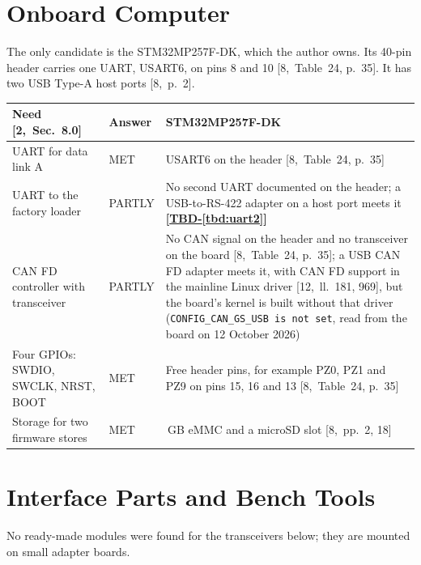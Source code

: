 \documentclass[11pt,a4paper]{article}
\newcommand{\tbd}[1]{\mbox{\textbf{[\hyperref[tbd:#1]{TBD-\ref*{tbd:#1}}]}}}
\begin{document}
\section{Onboard Computer}
The only candidate is the STM32MP257F-DK, which the author owns. Its 40-pin
header carries one UART, USART6, on pins 8 and 10 [8,~Table~24, p.~35]. It
has two USB Type-A host ports [8,~p.~2].

\smallskip
{\small\noindent\begin{tabularx}{\textwidth}{@{}>{\raggedright\arraybackslash}p{4.2cm}l>{\raggedright\arraybackslash}X@{}}
\toprule
Need [2,~Sec.~8.0] & Answer & STM32MP257F-DK \\
\midrule
UART for data link A & MET & USART6 on the header [8,~Table~24, p.~35] \\
UART to the factory loader & PARTLY & No second UART documented on the header; a USB-to-RS-422 adapter on a host port meets it \tbd{uart2} \\
CAN FD controller with transceiver & PARTLY & No CAN signal on the header and no transceiver on the board [8,~Table~24, p.~35]; a USB CAN FD adapter meets it, with CAN FD support in the mainline Linux driver [12,~ll.~181, 969], but the board's kernel is built without that driver (\texttt{CONFIG\_CAN\_GS\_USB is not set}, read from the board on 12 October 2026) \\
Four GPIOs: SWDIO, SWCLK, NRST, BOOT & MET & Free header pins, for example PZ0, PZ1 and PZ9 on pins 15, 16 and 13 [8,~Table~24, p.~35] \\
Storage for two firmware stores & MET & 8\,GB eMMC and a microSD slot [8,~pp.~2, 18] \\
\bottomrule
\end{tabularx}}

\section{Interface Parts and Bench Tools}
No ready-made modules were found for the transceivers below; they are mounted
on small adapter boards.
\end{document}
